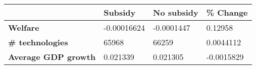 \begin{tabular}{|l|l|l|l|}
\hline
&\textbf{Subsidy}&\textbf{No subsidy}&\textbf{\% Change}\\\hline
\textbf{Welfare}&-0.00016624&-0.0001447&0.12958\\\hline
\textbf{\# technologies}&65968&66259&0.0044112\\\hline
\textbf{Average GDP growth}&0.021339&0.021305&-0.0015829\\\hline
\end{tabular}
